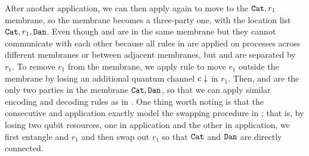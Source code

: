 After another  application, we can then apply  again to move  to the $\texttt{Cat},r_1$ membrane,
so the membrane becomes a three-party one, with the location list $\texttt{Cat},r_1,\texttt{Dan}$.
Even though  and  are in the same membrane but they cannot communicate with each other because all rules in  are applied on processes across different membranes or between adjacent membranes, but  and  are separated by $r_1$. 
To remove $r_1$ from the membrane, we apply rule  to move $r_1$ outside the membrane by losing an additional quantum channel $\down{c}$ in $r_1$.
Then,  and  are the only two parties in the membrane $\texttt{Cat},\texttt{Dan}$, so that we can apply similar encoding and decoding rules as in .
One thing worth noting is that the consecutive  and  application exactly model the swapping procedure in ; that is, by losing two qubit resources, one in  application and the other in  application, we first entangle  and $r_1$ and then swap out $r_1$ so that $\texttt{Cat}$ and $\texttt{Dan}$ are directly connected.


